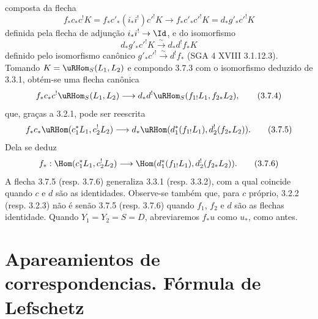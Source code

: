 composta da flecha
\[
f_*c_*c^!K=f_*c'_*(i_*i^!)c'^!K\longrightarrow f_*c'_*c'^!K=d_*g'_*c'^!K
\]
definida pela flecha de adjunção $i_*i^!\to\Id$, e do isomorfismo
\[
d_*g'_*c'^!K\xrightarrow{\sim}d_*d^!f_*K
\]
definido pelo isomorfismo canônico $g'_*c'^!\xrightarrow{\sim}d^!f_*$ (SGA 4 XVIII 3.1.12.3). Tomando $K=\uRHom_S(L_1,L_2)$ e compondo 3.7.3 com o isomorfismo deduzido de 3.3.1, obtém-se uma flecha canônica
\begin{equation}
f_*c_*c^!\uRHom_S(L_1,L_2)
\longrightarrow
 d_*d^!\uRHom_S(f_{1!}L_1,f_{2*}L_2),
\tag{3.7.4}
\end{equation}
que, graças a 3.2.1, pode ser reescrita
\begin{equation}
f_*c_*\uRHom(c_1^*L_1,c_2^!L_2)
\longrightarrow
 d_*\uRHom(d_1^*(f_{1!}L_1),d_2^!(f_{2*}L_2)).
\tag{3.7.5}
\end{equation}
Dela se deduz
\begin{equation}
f_*:\Hom(c_1^*L_1,c_2^!L_2)
\longrightarrow
\Hom(d_1^*(f_{1!}L_1),d_2^!(f_{2*}L_2)).
\tag{3.7.6}
\end{equation}
A flecha 3.7.5 (resp. 3.7.6) generaliza 3.3.1 (resp. 3.3.2), com a qual coincide quando $c$ e $d$ são as identidades. Observe-se também que, para $c$ próprio, 3.2.2 (resp. 3.2.3) não é senão 3.7.5 (resp. 3.7.6) quando $f_1$, $f_2$ e $d$ são as flechas identidade. Quando $Y_1=Y_2=S=D$, abreviaremos $f_*u$ como $u_*$, como antes.

\section{Apareamientos de correspondencias. Fórmula de Lefschetz}
